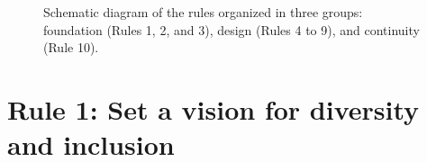\documentclass[10pt,letterpaper]{article}
\begin{document}


\begin{figure}[!h]
\centering
\caption{Schematic diagram of the rules organized in three groups: foundation (Rules 1, 2, and 3), design (Rules 4 to 9), and continuity (Rule 10).}
\label{fig:diagram}
\end{figure}


\section*{Rule 1: Set a vision for diversity and inclusion}
\label{rule_diversity}
\end{document}
